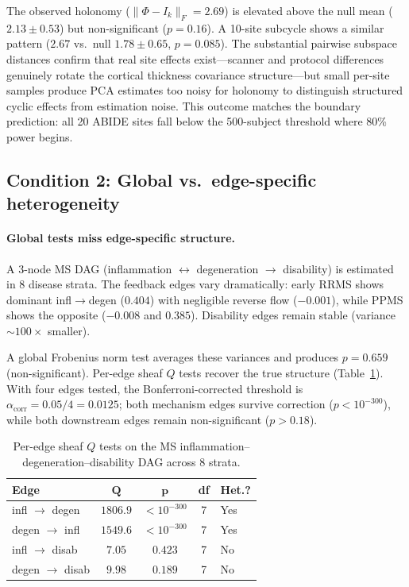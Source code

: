 \documentclass[11pt]{article}
\begin{document}
The observed holonomy ($\|\Phi - I_k\|_F = 2.69$) is elevated above the null mean ($2.13 \pm 0.53$) but non-significant ($p = 0.16$).
A 10-site subcycle shows a similar pattern ($2.67$ vs.\ null $1.78 \pm 0.65$, $p = 0.085$).
The substantial pairwise subspace distances confirm that real site effects exist---scanner and protocol differences genuinely rotate the cortical thickness covariance structure---but small per-site samples produce PCA estimates too noisy for holonomy to distinguish structured cyclic effects from estimation noise.
This outcome matches the boundary prediction: all 20 ABIDE sites fall below the 500-subject threshold where 80\% power begins.

\subsection{Condition 2: Global vs.\ edge-specific heterogeneity}
\label{sec:res-global-vs-edge}

\paragraph{Global tests miss edge-specific structure.}
A 3-node MS DAG (inflammation $\leftrightarrow$ degeneration $\to$ disability) is estimated in 8 disease strata.
The feedback edges vary dramatically: early RRMS shows dominant infl$\to$degen ($0.404$) with negligible reverse flow ($-0.001$), while PPMS shows the opposite ($-0.008$ and $0.385$).
Disability edges remain stable (variance $\sim\!100\times$ smaller).

A global Frobenius norm test averages these variances and produces $p = 0.659$ (non-significant).
Per-edge sheaf $Q$ tests recover the true structure (Table~\ref{tab:dag}). With four edges tested, the Bonferroni-corrected threshold is $\alpha_{\mathrm{corr}} = 0.05/4 = 0.0125$; both mechanism edges survive correction ($p < 10^{-300}$), while both downstream edges remain non-significant ($p > 0.18$).

\begin{table}[t]
\centering
\caption{Per-edge sheaf $Q$ tests on the MS inflammation--degeneration--disability DAG across 8 strata.}
\label{tab:dag}
\small
\begin{tabular}{@{}lcccl@{}}
\toprule
\textbf{Edge} & $\boldsymbol{Q}$ & $\boldsymbol{p}$ & \textbf{df} & \textbf{Het.?} \\
\midrule
infl $\to$ degen & $1806.9$ & $< 10^{-300}$ & 7 & Yes \\
degen $\to$ infl & $1549.6$ & $< 10^{-300}$ & 7 & Yes \\
infl $\to$ disab & $7.05$ & $0.423$ & 7 & No \\
degen $\to$ disab & $9.98$ & $0.189$ & 7 & No \\
\bottomrule
\end{tabular}
\end{table}
\end{document}
